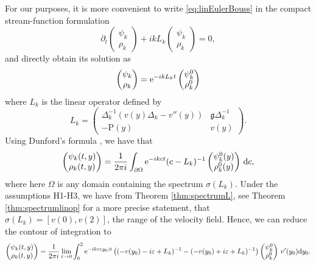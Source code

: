 \documentclass[11pt,reqno]{amsproc}
\theoremstyle{definition}
\numberwithin{equation}{section}
\newcommand{\D}{{\Delta}}
\renewcommand{\d}{\mathrm{d}}
\newcommand{\ep}{\varepsilon}
\newcommand\e{{\rm e}}
\newcommand{\p}{\partial}
\begin{document}
For our purposes, it is more convenient to write \eqref{eq:linEulerBouss} in the compact  stream-function formulation 
\begin{equation*}
\partial_t \begin{pmatrix} \psi_k \\ \rho_k\end{pmatrix}+ikL_k\begin{pmatrix}
\psi_k \\ \rho_k
\end{pmatrix}=0,
\end{equation*}
and directly obtain its solution as
\begin{equation*}
\begin{pmatrix} \psi_k \\ \rho_k\end{pmatrix}=\e^{-ikL_kt}\begin{pmatrix}
\psi_k^0 \\ \rho_k^0
\end{pmatrix}
\end{equation*}
where $L_k$ is the linear operator defined by
\begin{equation}\label{eq:linOP}
L_k =\begin{pmatrix}
\D_k^{-1}(v(y)\D_k-v''(y))  & \mathfrak{g}\D_k^{-1} \\
-\mathrm{P}(y) & v(y)
\end{pmatrix}.
\end{equation}
Using Dunford's formula \cites{Engel-Nagel, Taylor-11}, we have that
\begin{equation}\label{eq:Dunford}
\begin{pmatrix}
\psi_k(t,y) \\ \rho_k(t,y)
\end{pmatrix} = \frac{1}{2\pi i} \int_{\p\Omega}\e^{-ikct} (c-L_k)^{-1}\begin{pmatrix}
\psi_k^0(y) \\ \rho_k^0(y)
\end{pmatrix} \,\d c, 
\end{equation}
where here $\Omega$ is any domain containing the spectrum $\sigma(L_k)$. Under the assumptions H1-H3, we have from Theorem \ref{thm:spectrumL}, see Theorem \ref{thm:spectrumlinop} for a more precise statement, that $\sigma(L_k) = [v(0), v(2)]$, the range of the velocity field. Hence, we can reduce the contour of integration to  
\begin{equation}\label{eq:psirholim}
\begin{pmatrix}
\psi_k(t,y) \\ \rho_k(t,y)
\end{pmatrix} 
=\frac{1}{2\pi i }\lim_{\ep\rightarrow 0}\int_0^2 \e^{-ikv(y_0)t}\left((-v(y_0)-i\ep+L_k)^{-1}-(-v(y_0)+i\ep+L_k)^{-1}\right)
\begin{pmatrix}
\psi_k^0 \\ \rho_k^0 
\end{pmatrix}\, v'(y_0) \d y_0.
\end{equation}
\end{document}
